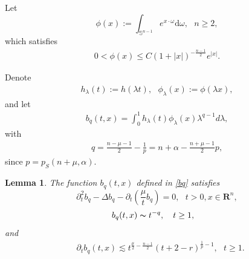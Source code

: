 \documentclass[review]{elsarticle}
\newtheorem{lem}[thm]{Lemma}
\newcommand{\R}{\mathbf{R}}
\begin{document}
Let
\begin{equation}\label{def:phi}
	\phi(x):=\int_{\mathbb{S}^{n-1}} e^{x\cdot\omega} \text{d}\omega,~~~ n \ge 2,
\end{equation}
which satisfies
\begin{equation}\label{testpro}
\begin{aligned}
0<\phi(x)\le C(1+|x|)^{-\frac{n-1}{2}}e^{|x|}.
\end{aligned}
\end{equation}

Denote
\begin{equation}\label{C1}
\begin{aligned}
h_\lambda(t):=h(\lambda t),~~~\phi_\lambda (x):=\phi(\lambda x),
\end{aligned}
\end{equation}
and
let
\begin{equation}\label{bq}
\begin{aligned}
b_q(t,x)=\int_{0}^{1}h_\lambda(t)\phi_{\lambda}(x)\lambda^{q-1}d\lambda,
\end{aligned}
\end{equation}
with
\begin{equation}\label{q}
\begin{aligned}
q=\frac{n-\mu-1}{2}-\frac{1}{p}=n+\alpha-\frac{n+\mu-1}{2}p,
\end{aligned}
\end{equation}
since $p=p_S(n+\mu, \alpha)$.
\begin{lem}\label{lbq}
The function $b_q(t, x)$ defined in \eqref{bq} satisfies
\begin{equation}\label{eqforbq}
\partial_t^2b_q-\Delta b_q-\partial_t\left(\frac{\mu}{t}b_q\right)=0,~~~t>0, x\in\R^n,
\end{equation}
\begin{equation}\label{asymforbq}
\begin{aligned}
&b_q(t, x)\thicksim t^{-q},~~~t\ge 1,
\end{aligned}
\end{equation}
and
\begin{equation}\label{asymfortbq}
\begin{aligned}
&\partial_t b_q(t, x)\lesssim t^{\frac{\mu}{2}-\frac{n-1}{2}}(t+2-r)^{\frac{1}{p}-1},~~~t\ge 1.
\end{aligned}
\end{equation}
\end{lem}
\end{document}

